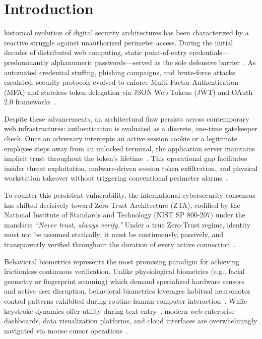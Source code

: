 \documentclass[10pt,journal,compsoc]{IEEEtran}
\begin{document}
\maketitle
\IEEEdisplaynontitleabstractindextext
\IEEEpeerreviewmaketitle

\section{Introduction}
 historical evolution of digital security architectures has been characterized by a reactive struggle against unauthorized perimeter access. During the initial decades of distributed web computing, static point-of-entry credentials—predominantly alphanumeric passwords—served as the sole defensive barrier~\cite{shen2022behavioral}. As automated credential stuffing, phishing campaigns, and brute-force attacks escalated, security protocols evolved to enforce Multi-Factor Authentication (MFA) and stateless token delegation via JSON Web Tokens (JWT) and OAuth 2.0 frameworks~\cite{wang2024zerotrust}. 

Despite these advancements, an architectural flaw persists across contemporary web infrastructures: authentication is evaluated as a discrete, one-time gatekeeper check. Once an adversary intercepts an active session cookie or a legitimate employee steps away from an unlocked terminal, the application server maintains implicit trust throughout the token's lifetime~\cite{chen2023anomaly, kumar2024preventing}. This operational gap facilitates insider threat exploitation, malware-driven session token exfiltration, and physical workstation takeover without triggering conventional perimeter alarms~\cite{gomez2022evaluating}.

To counter this persistent vulnerability, the international cybersecurity consensus has shifted decisively toward Zero-Trust Architecture (ZTA), codified by the National Institute of Standards and Technology (NIST SP 800-207) under the mandate: \textit{``Never trust, always verify.''} Under a true Zero-Trust regime, identity must not be assumed statically; it must be continuously, passively, and transparently verified throughout the duration of every active connection~\cite{wang2024zerotrust, silva2022implementing}.

Behavioral biometrics represents the most promising paradigm for achieving frictionless continuous verification. Unlike physiological biometrics (e.g., facial geometry or fingerprint scanning) which demand specialized hardware sensors and active user disruption, behavioral biometrics leverages habitual neuromotor control patterns exhibited during routine human-computer interaction~\cite{dave2024clicks, lee2022fusing}. While keystroke dynamics offer utility during text entry~\cite{lee2022fusing}, modern web enterprise dashboards, data visualization platforms, and cloud interfaces are overwhelmingly navigated via mouse cursor operations~\cite{zhang2022realtime, alqahtani2024webbased}.
\end{document}
